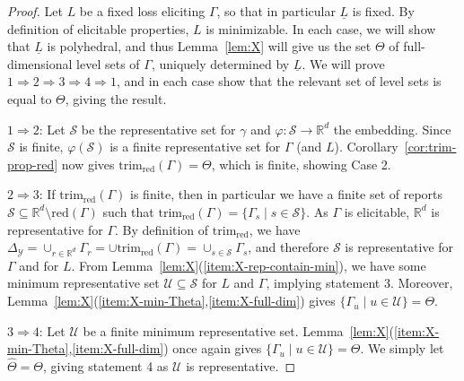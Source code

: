 \documentclass[11pt]{article}
\newcommand{\Comments}{1}
\newcommand{\mynote}[2]{\ifnum\Comments=1\textcolor{#1}{#2}\fi}
\newcommand{\mytodo}[2]{\ifnum\Comments=1%
  \todo[linecolor=#1!80!black,backgroundcolor=#1,bordercolor=#1!80!black]{#2}\fi}
\newcommand{\raft}[1]{\mytodo{green!20!white}{RF: #1}}
\newcommand{\jessie}[1]{\mynote{teal}{[JF: #1]}}
\newcommand{\jessiet}[1]{\mytodo{teal!20!white}{JF: #1}}
\newcommand{\reals}{\mathbb{R}}
\newcommand{\simplex}{\Delta_\Y}
\newcommand{\R}{\mathcal{R}}
\newcommand{\Sc}{\mathcal{S}}
\newcommand{\U}{\mathcal{U}}
\newcommand{\Y}{\mathcal{Y}}
\newcommand{\risk}[1]{\underline{#1}}
\newcommand{\red}{\mathrm{red}}
\newcommand{\trimred}{\mathrm{trim}_\red}
\begin{document}
\begin{proof}
  Let $L$ be a fixed loss eliciting $\Gamma$, so that in particular $\risk L$ is fixed.
  By definition of elicitable properties, $L$ is minimizable.
  In each case, we will show that $\risk L$ is polyhedral, and thus Lemma~\ref{lem:X} will give us the set $\Theta$ of full-dimensional level sets of $\Gamma$, uniquely determined by $\risk L$.
  We will prove $1 \Rightarrow 2 \Rightarrow 3 \Rightarrow 4 \Rightarrow 1$, and in each case show that the relevant set of level sets is equal to $\Theta$, giving the result.

  $1 \Rightarrow 2$:
  Let $\Sc$ be the representative set for $\gamma$ and $\varphi:\Sc\to\reals^d$ the embedding.
  Since $\Sc$ is finite, $\varphi(\Sc)$ is a finite representative set for $\Gamma$ (and $L$).
  Corollary~\ref{cor:trim-prop-red} now gives $\trimred(\Gamma) = \Theta$, which is finite, showing Case 2.

  $2 \Rightarrow 3$:
  If $\trimred(\Gamma)$ is finite, then in particular we have a finite set of reports $\Sc \subseteq \reals^d\setminus\red(\Gamma)$ such that $\trimred(\Gamma) = \{\Gamma_s \mid s\in\Sc\}$.
  As $\Gamma$ is elicitable, $\reals^d$ is representative for $\Gamma$.
  By definition of $\trimred$, we have $\simplex = \cup_{r\in\reals^d} \Gamma_r = \cup \trimred(\Gamma) = \cup_{s\in\Sc} \Gamma_s$, and therefore $\Sc$ is representative for $\Gamma$ and for $L$.
  From Lemma~\ref{lem:X}(\ref{item:X-rep-contain-min}), we have some minimum representative set $\U\subseteq\Sc$ for $L$ and $\Gamma$, implying statement 3.
  Moreover, Lemma~\ref{lem:X}(\ref{item:X-min-Theta},\ref{item:X-full-dim}) gives $\{\Gamma_u \mid u\in\U\} = \Theta$.

  $3 \Rightarrow 4$:
  Let $\U$ be a finite minimum representative set.
  Lemma~\ref{lem:X}(\ref{item:X-min-Theta},\ref{item:X-full-dim}) once again gives $\{\Gamma_u \mid u\in\U\} = \Theta$.
  We simply let $\hat\Theta = \Theta$, giving statement 4 as $\U$ is representative.


\end{proof}
\end{document}
